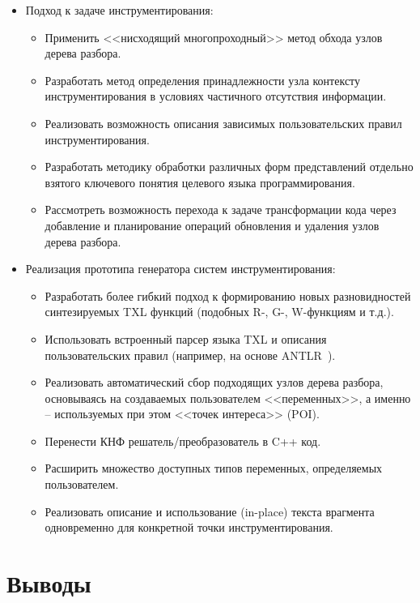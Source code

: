 \begin{itemize}[noitemsep]
  \item Подход к задаче инструментирования:
    \begin{itemize}[noitemsep]
        \item Применить <<нисходящий многопроходный>> метод обхода узлов дерева разбора.
        \item Разработать метод определения принадлежности узла контексту инструментирования в условиях частичного отсутствия информации.
        \item Реализовать возможность описания зависимых пользовательских правил инструментирования.
        \item Разработать методику обработки различных форм представлений отдельно взятого ключевого понятия целевого языка программирования.
        \item Рассмотреть возможность перехода к задаче трансформации кода через добавление и планирование операций обновления и удаления узлов дерева разбора.
    \end{itemize}

  \item Реализация прототипа генератора систем инструментирования:
    \begin{itemize}[noitemsep]
      \item Разработать более гибкий подход к формированию новых разновидностей синтезируемых TXL функций (подобных R-, G-, W-функциям и т.д.).
      \item Использовать встроенный парсер языка TXL и описания пользовательских правил (например, на основе ANTLR~\cite{antlr}).
      \item Реализовать автоматический сбор подходящих узлов дерева разбора, основываясь на создаваемых пользователем <<переменных>>, а именно -- используемых при этом <<точек интереса>> (POI).
      \item Перенести КНФ решатель/преобразователь в C++ код.
      \item Расширить множество доступных типов переменных, определяемых пользователем.
      \item Реализовать описание и использование (in-place) текста врагмента одновременно для конкретной точки инструментирования.
    \end{itemize}
\end{itemize}

\section{Выводы}

